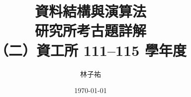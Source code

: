 \documentclass[12pt]{report}
\title{資料結構與演算法\\研究所考古題詳解\\[0.3em]{\LARGE （二）資工所 111--115 學年度}}
\author{林子祐}
\date{\today}
\renewcommand{\chaptermark}[1]{\markboth{第~\thechapter~章\quad #1}{}}
\begin{document}
\maketitle
\romantableofcontents




\appendix
{}
\renewcommand{\chaptermark}[1]{\markboth{附錄~\thechapter\quad #1}{}}


\end{document}
